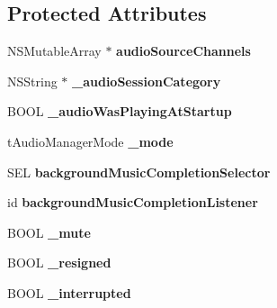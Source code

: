 \subsection*{Protected Attributes}
\begin{DoxyCompactItemize}
\item 
\mbox{\label{interfaceCDAudioManager_a90515e2e6192547922a8a95018d7b266}} 
N\+S\+Mutable\+Array $\ast$ {\bfseries audio\+Source\+Channels}
\item 
\mbox{\label{interfaceCDAudioManager_a698cb6e3679e4fe6775ae92c7ce1c564}} 
N\+S\+String $\ast$ {\bfseries \+\_\+audio\+Session\+Category}
\item 
\mbox{\label{interfaceCDAudioManager_a6b102ac1022cab5d35d5e486cd527fc6}} 
B\+O\+OL {\bfseries \+\_\+audio\+Was\+Playing\+At\+Startup}
\item 
\mbox{\label{interfaceCDAudioManager_a1ecb484491427443f47cf1d810d20fd4}} 
t\+Audio\+Manager\+Mode {\bfseries \+\_\+mode}
\item 
\mbox{\label{interfaceCDAudioManager_a9c9bd976a757b6b4d8851ec6dd03be6e}} 
S\+EL {\bfseries background\+Music\+Completion\+Selector}
\item 
\mbox{\label{interfaceCDAudioManager_a96ab8a0fa9e3480356ad4a6173bc3d4c}} 
id {\bfseries background\+Music\+Completion\+Listener}
\item 
\mbox{\label{interfaceCDAudioManager_a67d4323ad0b7fb59f96375b39c0f3480}} 
B\+O\+OL {\bfseries \+\_\+mute}
\item 
\mbox{\label{interfaceCDAudioManager_a9f6929916f5ba0807262d100045ac512}} 
B\+O\+OL {\bfseries \+\_\+resigned}
\item 
\mbox{\label{interfaceCDAudioManager_a69aa8f86be0608f599fead7368fb8133}} 
B\+O\+OL {\bfseries \+\_\+interrupted}
\item 
\mbox{\label{interfaceCDAudioManager_a01b2f1870ef239d99027e67833d24283}} 

\end{DoxyCompactItemize}
